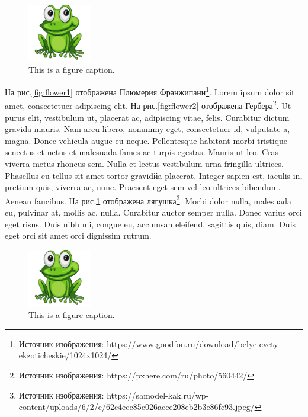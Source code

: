 % 
\begin{figure}
\centering
\renewcommand{\figurename}{Fig.}
\includegraphics[width=0.25\textwidth]{images/frog.jpg}
\caption{\label{fig:frog1}This is a figure caption.}
\label{fig:frog1}
\end{figure}

На рис.\ref{fig:flower1} отображена Плюмерия Франжипани\footnote{Источник изображения: {https://www.goodfon.ru/download/belye-cvety-ekzoticheskie/1024x1024/}}. 
Lorem ipsum dolor sit amet, consectetuer adipiscing elit. 
На рис.\ref{fig:flower2} отображена Гербера\footnote{Источник изображения: {https://pxhere.com/ru/photo/560442/}}.
Ut purus elit, vestibulum ut, placerat ac, adipiscing vitae, felis. Curabitur dictum gravida mauris. Nam arcu libero, nonummy eget, consectetuer id, vulputate a, magna. Donec vehicula augue eu neque. Pellentesque habitant morbi tristique senectus et netus et malesuada fames ac turpis egestas. Mauris ut leo. Cras viverra metus rhoncus sem. Nulla et lectus vestibulum urna fringilla ultrices.  Phasellus eu tellus sit amet tortor gravidйa placerat. Integer sapien est, iaculis in, pretium quis, viverra ac, nunc. Praesent eget sem vel leo ultrices bibendum. Aenean faucibus.
На рис.\ref{fig:frog1} отображена лягушка\footnote{Источник изображения: {https://samodel-kak.ru/wp-content/uploads/6/2/e/62e4ecc85c026acce208eb2b3e86fc93.jpeg/}}. Morbi dolor nulla, malesuada eu, pulvinar at, mollis ac, nulla. Curabitur auctor semper nulla. Donec varius orci eget risus. Duis nibh mi, congue eu, accumsan eleifend, sagittis quis, diam. Duis eget orci sit amet orci dignissim rutrum.


\begin{figure}
\centering
\includegraphics[width=0.25\textwidth]{images/frog.jpg}
\caption{\label{fig:frog2}This is a figure caption.}
\label{fig:frog2}
\end{figure}

